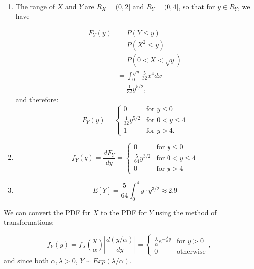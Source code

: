 \begin{problem}{5} $ $

\begin{enumerate}

\item The range of $X$ and $Y$ are $R_X = (0, 2]$ and $R_Y = (0, 4]$, so that for $y \in R_Y$, we have

\begin{align*}
F_Y(y) &= P(Y \le y)\\
& = P(X^2 \le y) \\
& = P(0  <X < \sqrt{y}) \\
& = \int_0^{\sqrt{y}} \frac{5}{32}x^4 dx \\
& = \frac{1}{32}y^{5/2},
\end{align*} 
and therefore:
\[
  F_Y(y) =
  \begin{cases}
                                   0 & \text{for $y \le 0$} \\
                                   \frac{1}{32}y^{5/2} & \text{for $0<y \le 4$} \\
                                   1 & \text{for $y>4$}.
  \end{cases}
\]

\item 
\[
  f_Y(y) = \frac{ d F_Y}{dy}=
  \begin{cases}
                                   0 & \text{for $y \le 0$} \\
                                  \frac{5}{64}y^{3/2} & \text{for $0<y \le 4$} \\
                                   0 & \text{for $y>4$}
  \end{cases}
\]
 
\item

\begin{equation*}
E[Y] = \frac{5}{64}\int_0^4 y\cdot y^{3/2} \approx 2.9
\end{equation*}
 
\end{enumerate}

\end{problem}





\begin{problem}{6}  We can convert the PDF for $X$ to the PDF for $Y$ using the method of transformations:


\[
  f_Y(y) = f_X\left(\frac{y}{\alpha}\right)\left|\frac{ d (y/\alpha)}{dy}\right|=
  \begin{cases}
                                   \frac{\lambda}{\alpha}e^{-\frac{\lambda}{\alpha} y} & \text{for $y>0$} \\
                                   0 & \text{otherwise} 

  \end{cases},
\]
and since both $\alpha, \lambda>0$, $Y\sim Exp(\lambda/\alpha)$.

\end{problem}

